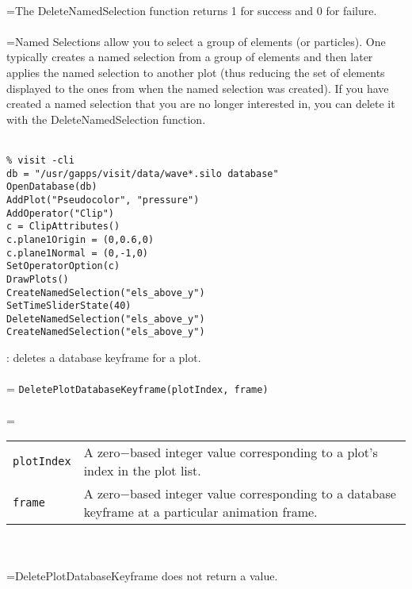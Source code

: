 \documentclass[10pt,a4paper]{report}
\begin{document}
 \\ 
\hangindent=\parindent The DeleteNamedSelection function returns 1 for success and 0 for failure. \\[-3mm] 

 \\ 
\hangindent=\parindent Named Selections allow you to select a group of elements (or particles). One typically creates a named selection from a group of elements and then later applies the named selection to another plot (thus reducing the set of elements displayed to the ones from when the named selection was created).  If you have created a named selection that you are no longer interested in, you can delete it with the DeleteNamedSelection function. \\[-3mm] 

\\[-6mm]
\begin{verbatim}% visit -cli
db = "/usr/gapps/visit/data/wave*.silo database"
OpenDatabase(db)
AddPlot("Pseudocolor", "pressure")
AddOperator("Clip")
c = ClipAttributes()
c.plane1Origin = (0,0.6,0)
c.plane1Normal = (0,-1,0)
SetOperatorOption(c)
DrawPlots()
CreateNamedSelection("els_above_y")
SetTimeSliderState(40)
DeleteNamedSelection("els_above_y")
CreateNamedSelection("els_above_y")
\end{verbatim}
\newpage


{}
: deletes a database keyframe for a plot.\\[-3mm]

 \\ 
\hangindent=\parindent 
\verb!DeletePlotDatabaseKeyframe(plotIndex, frame)!\\ [-3mm]

 \\ 
\hangindent=\parindent 
\begin{tabular}{lp{9cm}}
\verb!plotIndex! & A zero$-$based integer value corresponding to a plot's index in the plot list. \\
\verb!frame! & A zero$-$based integer value corresponding to a database keyframe at a particular animation frame. \\
\end{tabular} \\[-2mm]


 \\ 
\hangindent=\parindent DeletePlotDatabaseKeyframe does not return a value. \\[-3mm] 
\end{document}
